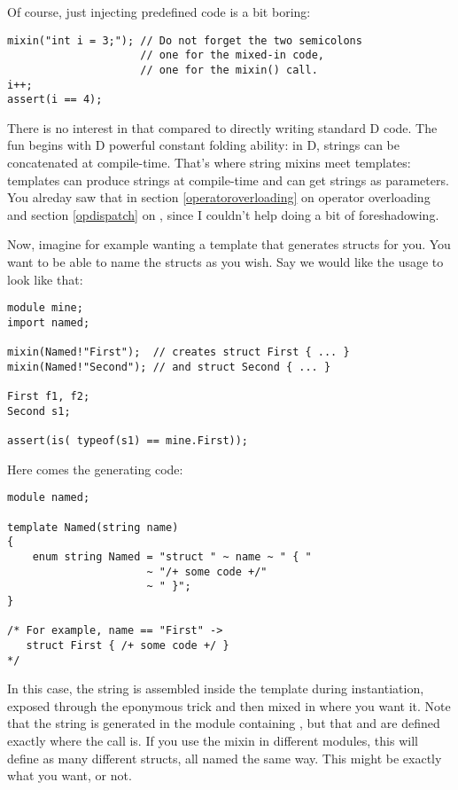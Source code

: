 Of course, just injecting predefined code is a bit boring:

\begin{verbatim}
mixin("int i = 3;"); // Do not forget the two semicolons
                     // one for the mixed-in code,
                     // one for the mixin() call.
i++;
assert(i == 4);
\end{verbatim}

There is no interest in that compared to directly writing standard D code. The fun begins with D powerful constant folding ability: in D, strings can be concatenated at compile-time. That's where string mixins meet templates: templates can produce strings at compile-time and can get strings as parameters. You alreday saw that in section \ref{operatoroverloading} on operator overloading and section \ref{opdispatch} on , since I couldn't help doing a bit of foreshadowing.

Now, imagine for example wanting a template that generates structs for you. You want to be able to name the structs as you wish. Say we would like the usage to look like that:

\begin{verbatim}
module mine;
import named;

mixin(Named!"First");  // creates struct First { ... }
mixin(Named!"Second"); // and struct Second { ... }

First f1, f2;
Second s1;

assert(is( typeof(s1) == mine.First));
\end{verbatim}

Here comes the generating code:

\begin{verbatim}
module named;

template Named(string name)
{
    enum string Named = "struct " ~ name ~ " { "
                      ~ "/+ some code +/"
                      ~ " }";
}

/* For example, name == "First" ->
   struct First { /+ some code +/ }
*/
\end{verbatim}

In this case, the string is assembled inside the template during instantiation,  exposed through the eponymous trick and then mixed in where you want it. Note that the string is generated in the module containing , but that  and  are defined exactly where the \DD{()} call is. If you use the mixin in different modules, this will define as many different structs, all named the same way. This might be exactly what you want, or not.

